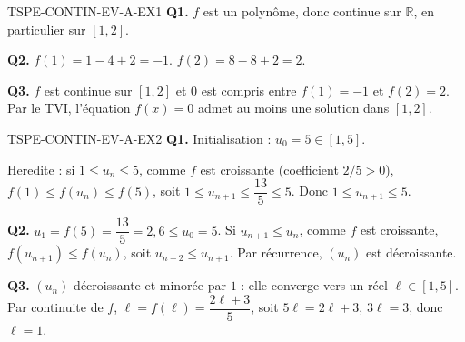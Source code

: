 \begin{corrige}{TSPE-CONTIN-EV-A-EX1}
\textbf{Q1.} $f$ est un polynôme, donc continue sur $\mathbb{R}$, en particulier sur $[1,2]$.

\textbf{Q2.} $f(1) = 1 - 4 + 2 = -1$. $f(2) = 8 - 8 + 2 = 2$.

\textbf{Q3.} $f$ est continue sur $[1,2]$ et $0$ est compris entre $f(1)=-1$ et $f(2)=2$. Par le TVI, l'équation $f(x)=0$ admet au moins une solution dans $[1,2]$.
\end{corrige}

\begin{corrige}{TSPE-CONTIN-EV-A-EX2}
\textbf{Q1.} Initialisation : $u_0=5 \in [1,5]$.

Heredite : si $1 \leq u_n \leq 5$, comme $f$ est croissante (coefficient $2/5>0$), $f(1) \leq f(u_n) \leq f(5)$, soit $1 \leq u_{n+1} \leq \dfrac{13}{5} \leq 5$. Donc $1 \leq u_{n+1} \leq 5$.

\textbf{Q2.} $u_1 = f(5) = \dfrac{13}{5} = 2{,}6 \leq u_0 = 5$. Si $u_{n+1} \leq u_n$, comme $f$ est croissante, $f(u_{n+1}) \leq f(u_n)$, soit $u_{n+2}\leq u_{n+1}$. Par récurrence, $(u_n)$ est décroissante.

\textbf{Q3.} $(u_n)$ décroissante et minorée par $1$ : elle converge vers un réel $\ell \in [1,5]$. Par continuite de $f$, $\ell = f(\ell) = \dfrac{2\ell+3}{5}$, soit $5\ell = 2\ell+3$, $3\ell=3$, donc $\ell=1$.
\end{corrige}

